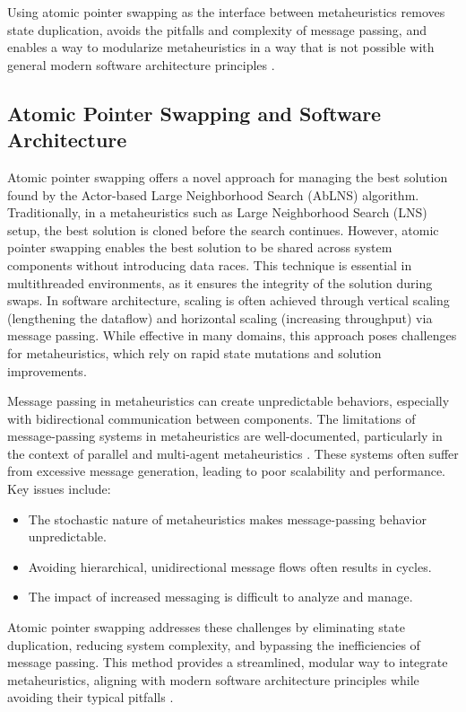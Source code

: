 Using atomic pointer swapping as the interface between metaheuristics removes 
state duplication, avoids the pitfalls and complexity 
of message passing, and enables a way to modularize metaheuristics in a way
that is not possible with general modern software architecture principles
\citep{richards_fundamentals_2020}. 

% 
\subsection{Atomic Pointer Swapping and Software Architecture}
Atomic pointer swapping offers a novel approach for managing the best
solution found by the Actor-based Large Neighborhood Search (AbLNS) algorithm.
Traditionally, in a metaheuristics such as Large Neighborhood Search (LNS) setup, 
the best solution
is cloned before the search continues. However, atomic pointer swapping enables
the best solution to be shared across system components without introducing data
races. This technique is essential in multithreaded environments, as it ensures
the integrity of the solution during swaps. In software architecture, scaling
is often achieved through vertical scaling (lengthening the dataflow) and
horizontal scaling (increasing throughput) via message passing. While effective
in many domains, this approach poses challenges for metaheuristics, which
rely on rapid state mutations and solution improvements. 

Message passing in metaheuristics can create unpredictable behaviors,
especially with bidirectional communication between components. The
limitations of message-passing systems in metaheuristics are well-documented,
particularly in the context of parallel and multi-agent metaheuristics
\citep{talbiMetaheuristicsDesignImplementation2009}. These systems often
suffer from excessive message generation, leading to poor scalability and
performance. Key issues include: \begin{itemize} \item The stochastic nature
of metaheuristics makes message-passing behavior unpredictable. \item Avoiding
hierarchical, unidirectional message flows often results in cycles. \item The
impact of increased messaging is difficult to analyze and manage. \end{itemize}
Atomic pointer swapping addresses these challenges by eliminating state
duplication, reducing system complexity, and bypassing the inefficiencies of
message passing. This method provides a streamlined, modular way to integrate
metaheuristics, aligning with modern software architecture principles while
avoiding their typical pitfalls \citep{richards_fundamentals_2020}.
